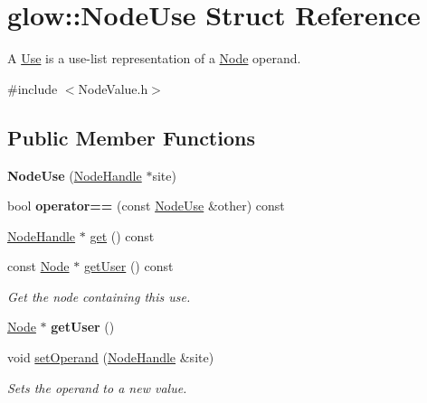 \hypertarget{structglow_1_1_node_use}{}\section{glow\+:\+:Node\+Use Struct Reference}
\label{structglow_1_1_node_use}


A \textquotesingle{}\hyperlink{structglow_1_1_use}{Use}\textquotesingle{} is a use-\/list representation of a \hyperlink{classglow_1_1_node}{Node} operand.  




{\ttfamily \#include $<$Node\+Value.\+h$>$}

\subsection*{Public Member Functions}
\begin{DoxyCompactItemize}
\item 
\mbox{\label{structglow_1_1_node_use_ac2c322af415363f4098efe66874d3ed4}} 
{\bfseries Node\+Use} (\hyperlink{structglow_1_1_node_handle}{Node\+Handle} $\ast$site)
\item 
\mbox{\label{structglow_1_1_node_use_a9741e1c8b5aaf976c7cb76c10c5bb260}} 
bool {\bfseries operator==} (const \hyperlink{structglow_1_1_node_use}{Node\+Use} \&other) const
\item 
\hyperlink{structglow_1_1_node_handle}{Node\+Handle} $\ast$ \hyperlink{structglow_1_1_node_use_aee3154b05759438b149f938279d0a93c}{get} () const
\item 
\mbox{\label{structglow_1_1_node_use_a3d4d049c959bb70fde84f4c7c4ebdf41}} 
const \hyperlink{classglow_1_1_node}{Node} $\ast$ \hyperlink{structglow_1_1_node_use_a3d4d049c959bb70fde84f4c7c4ebdf41}{get\+User} () const
\begin{DoxyCompactList}\small\item\em Get the node containing this use. \end{DoxyCompactList}\item 
\mbox{\label{structglow_1_1_node_use_a740287d6dd72dc75aac98701d8593b37}} 
\hyperlink{classglow_1_1_node}{Node} $\ast$ {\bfseries get\+User} ()
\item 
\mbox{\label{structglow_1_1_node_use_aad143eaba5ceff7cceb890836a83eede}} 
void \hyperlink{structglow_1_1_node_use_aad143eaba5ceff7cceb890836a83eede}{set\+Operand} (\hyperlink{structglow_1_1_node_handle}{Node\+Handle} \&site)
\begin{DoxyCompactList}\small\item\em Sets the operand to a new value. \end{DoxyCompactList}\end{DoxyCompactItemize}
